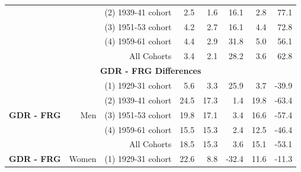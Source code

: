 \begin{Article}
\begin{refsection}[Spitz]
\begin{landscape}
\begin{table}[]
{\begin{tabular}{lll*5{r}}
\multicolumn{1}{r}{} & \multicolumn{1}{r}{} & \multicolumn{1}{r}{(2) 1939-41 cohort} & \multicolumn{1}{r}{2.5} & \multicolumn{1}{r}{1.6} & \multicolumn{1}{r}{16.1} & \multicolumn{1}{r}{2.8} & 77.1 \\ \cline{3-8} 
\multicolumn{1}{r}{} & \multicolumn{1}{r}{} & \multicolumn{1}{r}{(3) 1951-53 cohort} & \multicolumn{1}{r}{4.2} & \multicolumn{1}{r}{2.7} & \multicolumn{1}{r}{16.1} & \multicolumn{1}{r}{4.4} & 72.8 \\ \cline{3-8} 
\multicolumn{1}{r}{} & \multicolumn{1}{r}{} & \multicolumn{1}{r}{(4) 1959-61 cohort} & \multicolumn{1}{r}{4.4} & \multicolumn{1}{r}{2.9} & \multicolumn{1}{r}{31.8} & \multicolumn{1}{r}{5.0} & 56.1 \\ \cline{3-8} 
\multicolumn{1}{r}{} & \multicolumn{1}{r}{} & \multicolumn{1}{r}{All Cohorts} & \multicolumn{1}{r}{3.4} & \multicolumn{1}{r}{2.1} & \multicolumn{1}{r}{28.2} & \multicolumn{1}{r}{3.6} & 62.8 \\ \hline
\multicolumn{8}{c}{\multirow{2}{*}{\textbf{GDR - FRG Differences}}} \\
\multicolumn{8}{c}{} \\ \hline
\multicolumn{1}{r}{\multirow{5}{*}{\textbf{GDR - FRG}}} & \multicolumn{1}{r}{\multirow{5}{*}{Men}} & \multicolumn{1}{r}{(1) 1929-31 cohort} & \multicolumn{1}{r}{5.6} & \multicolumn{1}{r}{3.3} & \multicolumn{1}{r}{25.9} & \multicolumn{1}{r}{3.7} & -39.9 \\ \cline{3-8} 
\multicolumn{1}{r}{} & \multicolumn{1}{r}{} & \multicolumn{1}{r}{(2) 1939-41 cohort} & \multicolumn{1}{r}{24.5} & \multicolumn{1}{r}{17.3} & \multicolumn{1}{r}{1.4} & \multicolumn{1}{r}{19.8} & -63.4 \\ \cline{3-8} 
\multicolumn{1}{r}{} & \multicolumn{1}{r}{} & \multicolumn{1}{r}{(3) 1951-53 cohort} & \multicolumn{1}{r}{19.8} & \multicolumn{1}{r}{17.1} & \multicolumn{1}{r}{3.4} & \multicolumn{1}{r}{16.6} & -57.4 \\ \cline{3-8} 
\multicolumn{1}{r}{} & \multicolumn{1}{r}{} & \multicolumn{1}{r}{(4) 1959-61 cohort} & \multicolumn{1}{r}{15.5} & \multicolumn{1}{r}{15.3} & \multicolumn{1}{r}{2.4} & \multicolumn{1}{r}{12.5} & -46.4 \\ \cline{3-8} 
\multicolumn{1}{r}{} & \multicolumn{1}{r}{} & \multicolumn{1}{r}{All Cohorts} & \multicolumn{1}{r}{18.5} & \multicolumn{1}{r}{15.3} & \multicolumn{1}{r}{3.6} & \multicolumn{1}{r}{15.1} & -53.1 \\ \hline
\multicolumn{1}{r}{\multirow{5}{*}{\textbf{GDR - FRG}}} & \multicolumn{1}{r}{\multirow{5}{*}{Women}} & \multicolumn{1}{r}{(1) 1929-31 cohort} & \multicolumn{1}{r}{22.6} & \multicolumn{1}{r}{8.8} & \multicolumn{1}{r}{-32.4} & \multicolumn{1}{r}{11.6} & -11.3 \\ \cline{3-8} 

\end{tabular}}
\end{table}
\end{landscape}
\end{refsection}
\end{Article}

